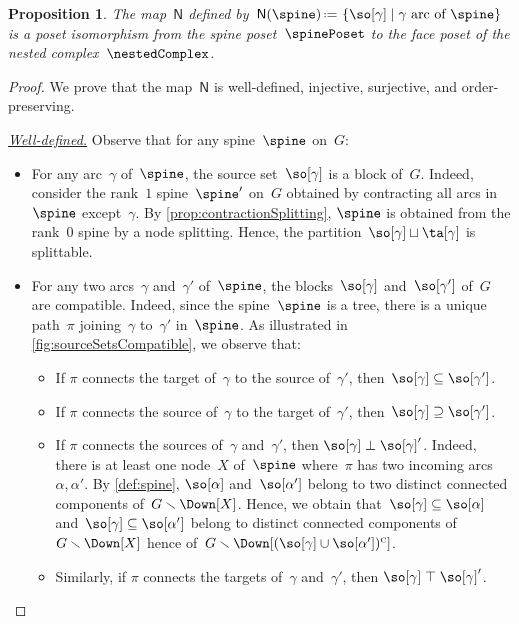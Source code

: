 \documentclass{amsart}
\newtheorem{proposition}[theorem]{Proposition}
\theoremstyle{definition}
\newcommand{\set}[2]{\left\{ #1 \;\middle|\; #2 \right\}} %
\newcommand{\ssm}{\smallsetminus} %
\newcommand{\eqdef}{\mbox{\,\raisebox{0.2ex}{\scriptsize\ensuremath{\mathrm:}}\ensuremath{=}\,}} %
\newcommand{\para}[1]{\medskip\noindent\uline{\textit{#1.}}} %
\newcommand{\vincent}[1]{\todo[color=blue!30]{#1 \\ \hfill --- V.}}
\newcommand{\negDisjoint}{\perp} %
\newcommand{\posDisjoint}{\;\top\;} %
\newcommand{\compl}[1]{#1{}^\textsc{c}} %
\newcommand{\spineToNested}{\mathsf{N}} %
\begin{document}
\begin{proposition}
  \label{prop:spineToNested}
  The map~$\spineToNested$ defined by~$\spineToNested(\spine) \eqdef \set{\so[\gamma]}{\gamma \text{ arc of } \spine}$ is a poset isomorphism from the spine poset~$\spinePoset$ to the face poset of the nested complex~$\nestedComplex$.
\end{proposition}

\begin{proof}
  We prove that the map~$\spineToNested$ is well-defined, injective, surjective, and order-preserving.
  
  \para{Well-defined}
  Observe that for any spine~$\spine$ on~$G$:
  \begin{itemize}
    \item For any arc~$\gamma$ of~$\spine$, the source set~$\so[\gamma]$ is a block of~$G$. 
    Indeed, consider the rank~$1$ spine~$\spine'$ on~$G$ obtained by contracting all arcs in~$\spine$ except~$\gamma$. 
    By \cref{prop:contractionSplitting}, $\spine$ is obtained from the rank~$0$ spine by a node splitting. 
    Hence, the partition~$\so[\gamma] \sqcup \ta[\gamma]$ is splittable.
    \item For any two arcs~$\gamma$ and~$\gamma'$ of~$\spine$, the blocks~$\so[\gamma]$ and~$\so[\gamma']$ of~$G$ are compatible. 
    Indeed, since the spine~$\spine$ is a tree, there is a unique path~$\pi$ joining~$\gamma$ to~$\gamma'$ in~$\spine$.
    As illustrated in \cref{fig:sourceSetsCompatible}, we observe that:
    \vincent{borrow picture...}
    \begin{itemize}
      \item If $\pi$ connects the target of~$\gamma$ to the source of~$\gamma'$, then~$\so[\gamma] \subseteq \so[\gamma']$.
      \item If $\pi$ connects the source of~$\gamma$ to the target of~$\gamma'$, then~$\so[\gamma] \supseteq \so[\gamma']$.
      \item If $\pi$ connects the sources of~$\gamma$ and~$\gamma'$, then $\so[\gamma] \negDisjoint \so[\gamma]'$.
      Indeed, there is at least one node~$X$ of~$\spine$ where~$\pi$ has two incoming arcs~$\alpha, \alpha'$.
      By \cref{def:spine}, $\so[\alpha]$ and~$\so[\alpha']$ belong to two distinct connected components of~$G \ssm \Down[X]$.
      Hence, we obtain that~$\so[\gamma] \subseteq \so[\alpha]$ and~$\so[\gamma] \subseteq \so[\alpha']$ belong to distinct connected components of~$G \ssm \Down[X]$ hence of~$G \ssm \Down[\compl{(\so[\gamma] \cup \so[\alpha'])}]$.
      \item Similarly, if $\pi$ connects the targets of~$\gamma$ and~$\gamma'$, then $\so[\gamma] \posDisjoint \so[\gamma]'$.
    \end{itemize}
  \end{itemize}


\end{proof}
\end{document}
